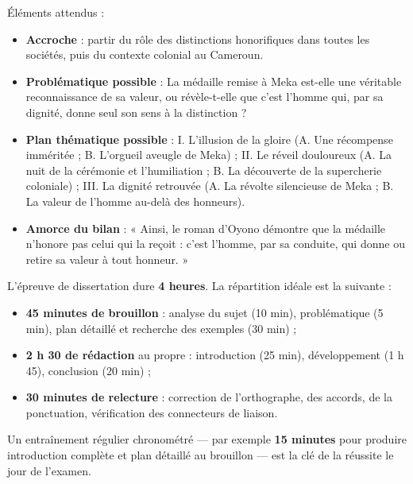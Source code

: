 \documentclass[11pt]{article}
\begin{document}
\begin{corrige}
Éléments attendus :
\begin{itemize}
\item \textbf{Accroche} : partir du rôle des distinctions honorifiques dans toutes les sociétés, puis du contexte colonial au Cameroun.
\item \textbf{Problématique possible} : La médaille remise à Meka est-elle une véritable reconnaissance de sa valeur, ou révèle-t-elle que c'est l'homme qui, par sa dignité, donne seul son sens à la distinction ?
\item \textbf{Plan thématique possible} : I. L'illusion de la gloire (A. Une récompense imméritée ; B. L'orgueil aveugle de Meka) ; II. Le réveil douloureux (A. La nuit de la cérémonie et l'humiliation ; B. La découverte de la supercherie coloniale) ; III. La dignité retrouvée (A. La révolte silencieuse de Meka ; B. La valeur de l'homme au-delà des honneurs).
\item \textbf{Amorce du bilan} : « Ainsi, le roman d'Oyono démontre que la médaille n'honore pas celui qui la reçoit : c'est l'homme, par sa conduite, qui donne ou retire sa valeur à tout honneur. »
\end{itemize}
\end{corrige}

\begin{exemplebox}
L'épreuve de dissertation dure \textbf{4 heures}. La répartition idéale est la suivante :
\begin{itemize}
\item \textbf{45 minutes de brouillon} : analyse du sujet (10 min), problématique (5 min), plan détaillé et recherche des exemples (30 min) ;
\item \textbf{2 h 30 de rédaction} au propre : introduction (25 min), développement (1 h 45), conclusion (20 min) ;
\item \textbf{30 minutes de relecture} : correction de l'orthographe, des accords, de la ponctuation, vérification des connecteurs de liaison.
\end{itemize}
Un entraînement régulier chronométré — par exemple \textbf{15 minutes} pour produire introduction complète et plan détaillé au brouillon — est la clé de la réussite le jour de l'examen.
\end{exemplebox}
\end{document}
